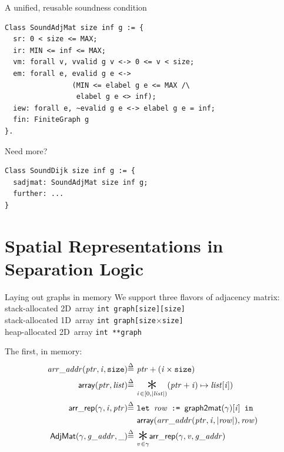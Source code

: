 \documentclass[usenames, xcolor=dvipsnames]{beamer}
\newcommand{\scon}{\mathbin{\ast}}
\renewcommand{\bigstar}{\raisebox{-0.24em}{{\scaleobj{2.5}{\scon}}}}
\newcommand{\defeq}{\mathbin{\stackrel{\Delta}{=}}}
\newcommand{\hide}[1]{}
\newcommand{\m}[1]{\ensuremath{\mathit{#1}}} %
\newcommand{\p}[1]{\ensuremath{\mathsf{#1}}} %
\begin{document}
\begin{frame}[fragile]{A unified, reusable soundness condition}

\begin{Verbatim}
Class SoundAdjMat size inf g := {
  sr: 0 < size <= MAX;
  ir: MIN <= inf <= MAX; 
  vm: forall v, vvalid g v <-> 0 <= v < size;
  em: forall e, evalid g e <-> 
                (MIN <= elabel g e <= MAX /\ 
                 elabel g e <> inf);
  iew: forall e, ~evalid g e <-> elabel g e = inf;
  fin: FiniteGraph g
}.
\end{Verbatim}

\pause \bigskip

Need more?
\begin{Verbatim}
Class SoundDijk size inf g := {
  sadjmat: SoundAdjMat size inf g;
  further: ...
}
\end{Verbatim}

\end{frame}


\section{Spatial Representations in Separation Logic}

\begin{frame}{Laying out graphs in memory}
We support three flavors of adjacency matrix: \\
\hspace{1em}stack-allocated 2D~array \texttt{int~graph[size][size]} \\
\hspace{1em}stack-allocated 1D~array \texttt{int~graph[size$\times$size]} \\
\hspace{1em}heap-allocated 2D~array \texttt{int~**graph}

\bigskip \pause
The first, in memory: 
\vspace{-0.8em}
\begin{equation*}
\begin{split}
\m{arr\_addr} (\m{ptr}, \m{i},\texttt{size}) \defeq~&
  \m{ptr} + (\m{i} \times \hide{\texttt{sizeof}(\texttt{int}) \times} \texttt{size}) \\
\mathsf{array}(\m{ptr},\m{list}) \defeq~& \underset{\m{i}\hspace{0.1em} \in [0, \lvert\m{list}\rvert)}{\bigstar} (\m{ptr} + \m{i}) \mapsto \m{list}[\m{i}]) \\
\p{arr\_rep}(\gamma, \m{i}, \m{ptr}) \defeq~& \texttt{let }\m{row} \texttt{ := }\mathsf{graph2mat}(\gamma)[\m{i}] \texttt{ in } \\
&\mathsf{array}(\m{arr\_addr}(\m{ptr},\m{i},\lvert\m{row}\rvert), \m{row}) \\
\vspace{1em}
\p{AdjMat}(\gamma, \m{g\_addr}, \_) \defeq~& \underset{\m{v}\hspace{0.1em} \in \gamma}{\bigstar} \p{arr\_rep}(\gamma, \m{v}, \m{g\_addr})
\end{split}
\end{equation*}

\end{frame}
\end{document}
